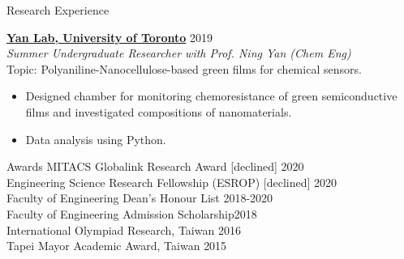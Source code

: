 \documentclass[hidelinks]{my_resume} %
\begin{document}
\begin{minipage}[t]{0.66\textwidth}
        \vspace{5pt} 



    \begin{rSection}{Research Experience}
        \vspace{5pt} 
    
        \href{https://ningyanlab.com/}{\textbf{Yan Lab, University of Toronto}}     \hfill{2019}\\
        \emph{Summer Undergraduate Researcher with Prof. Ning Yan (Chem Eng)} \\
        Topic: Polyaniline-Nanocellulose-based green films for chemical sensors. 
        \begin{itemize}
            \item Designed chamber for monitoring chemoresistance of green semiconductive films and investigated compositions of nanomaterials.
            \item Data analysis using Python. 
        \end{itemize}
    \end{rSection}
\vspace{5pt}

        

    \begin{rSection}{Awards}
        MITACS Globalink Research Award [declined]             \hfill{2020}\\
        Engineering Science Research Fellowship (ESROP) [declined] \hfill{2020}\\
        Faculty of Engineering Dean's Honour List \hfill{2018-2020} \\
        Faculty of Engineering Admission Scholarship\hfill{2018} \\
        International Olympiad Research, Taiwan \hfill{2016} \\
        Tapei Mayor Academic Award, Taiwan      \hfill{2015} 
    \end{rSection}




\end{minipage}
\end{document}
